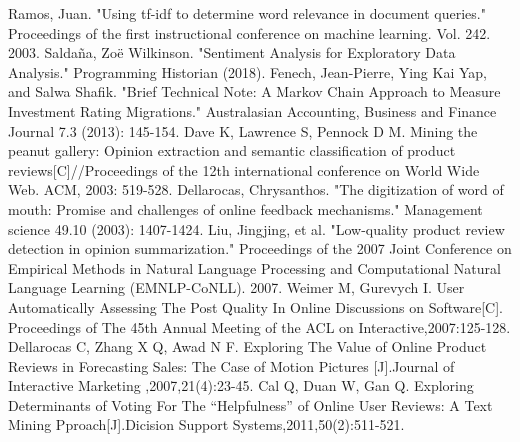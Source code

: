 \documentclass[12pt]{mcmthesis}
\begin{document}
\newpage
\begin{thebibliography}{99}
Ramos, Juan. "Using tf-idf to determine word relevance in document queries." Proceedings of the first instructional conference on machine learning. Vol. 242. 2003.
Saldaña, Zoë Wilkinson. "Sentiment Analysis for Exploratory Data Analysis." Programming Historian (2018).  
Fenech, Jean-Pierre, Ying Kai Yap, and Salwa Shafik. "Brief Technical Note: A Markov Chain Approach to Measure Investment Rating Migrations." Australasian Accounting, Business and Finance Journal 7.3 (2013): 145-154.  
Dave K, Lawrence S, Pennock D M. Mining the peanut gallery: Opinion extraction and semantic classification of product reviews[C]//Proceedings of the 12th international conference on World Wide Web. ACM, 2003: 519-528. 
Dellarocas, Chrysanthos. "The digitization of word of mouth: Promise and challenges of online feedback mechanisms." Management science 49.10 (2003): 1407-1424. 
Liu, Jingjing, et al. "Low-quality product review detection in opinion summarization." Proceedings of the 2007 Joint Conference on Empirical Methods in Natural Language Processing and Computational Natural Language Learning (EMNLP-CoNLL). 2007. 
Weimer M, Gurevych I. User Automatically Assessing The Post Quality In Online Discussions on Software[C]. Proceedings of The 45th Annual Meeting of the ACL on Interactive,2007:125-128.
Dellarocas C, Zhang X Q, Awad N F. Exploring The Value of Online Product Reviews in Forecasting Sales: The Case of Motion Pictures [J].Journal of 
Interactive Marketing ,2007,21(4):23-45.
 Cal Q, Duan W, Gan Q. Exploring Determinants of Voting For The “Helpfulness” of Online User Reviews: A Text Mining Pproach[J].Dicision Support Systems,2011,50(2):511-521. 
\end{thebibliography}
\end{document}
